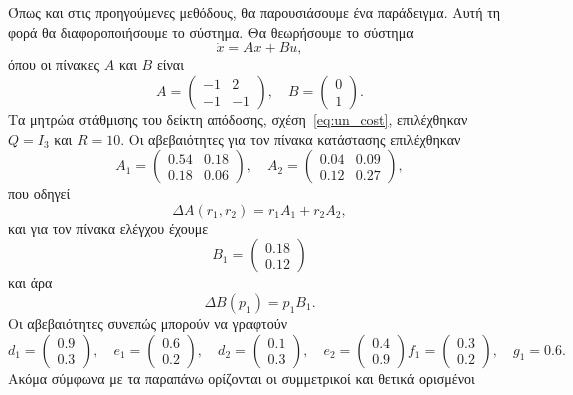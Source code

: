 Όπως και στις προηγούμενες μεθόδους, θα παρουσιάσουμε ένα παράδειγμα. Αυτή τη
φορά θα διαφοροποιήσουμε το σύστημα. Θα θεωρήσουμε το σύστημα
\[
    \dot{x} = Ax + Bu,
\]
όπου οι πίνακες \( A \) και \( B \) είναι
\[
    A =
    \begin{pmatrix}
        -1 & 2 \\
        -1 & -1
    \end{pmatrix}, \quad
    B = \begin{pmatrix}0 \\ 1\end{pmatrix}.
\]
Τα μητρώα στάθμισης του δείκτη απόδοσης, σχέση~\eqref{eq:un_cost}, επιλέχθηκαν
\( Q = I_3 \) και \( R = 10 \). Οι αβεβαιότητες για τον πίνακα κατάστασης
επιλέχθηκαν
\[
    A_1 =
    \begin{pmatrix}
        0.54 & 0.18 \\
        0.18 &  0.06
    \end{pmatrix},\quad
    A_2 =
    \begin{pmatrix}
        0.04 & 0.09 \\
        0.12 & 0.27
    \end{pmatrix},
\]
που οδηγεί
\[
    \Delta A(r_1, r_2) = r_1A_1 + r_2A_2,
\]
και για τον πίνακα ελέγχου έχουμε
\[
    B_1 =
    \begin{pmatrix}
        0.18 \\
        0.12
    \end{pmatrix}
\]
και άρα
\[
    \Delta B(p_1) = p_1B_1.
\]
Οι αβεβαιότητες συνεπώς μπορούν να γραφτούν
\[
    d_1 =
    \begin{pmatrix}
        0.9 \\ 0.3
    \end{pmatrix},\quad
    e_1 =
    \begin{pmatrix}
        0.6 \\ 0.2
    \end{pmatrix},\quad
    d_2 =
    \begin{pmatrix}
        0.1 \\ 0.3
    \end{pmatrix},\quad
    e_2 =
    \begin{pmatrix}
        0.4 \\ 0.9
    \end{pmatrix}
    f_1 =
    \begin{pmatrix}
        0.3 \\ 0.2
    \end{pmatrix},\quad
    g_1 = 0.6.
\]
Ακόμα σύμφωνα με τα παραπάνω ορίζονται οι συμμετρικοί και θετικά ορισμένοι

